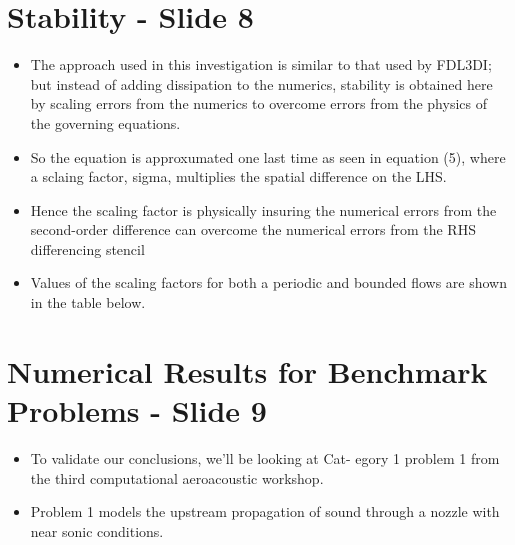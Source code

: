 \documentclass[a4paper,17pt]{extarticle}
\begin{document}
\pagebreak \section*{Stability - Slide 8}
\begin{itemize}
   \item The approach used in this investigation is similar to that used by FDL3DI; but instead of
      adding dissipation to the numerics, stability is obtained here by scaling errors from the
      numerics to overcome errors from the physics of the governing equations.
   \item So the equation is approxumated one last time as seen in equation (5), where a sclaing
         factor, sigma, multiplies the spatial difference on the LHS. 
   \item Hence the scaling factor is physically insuring the numerical errors from the second-order
         difference can overcome the numerical errors from the RHS differencing stencil
   \item Values of the scaling factors for both a periodic and bounded flows are shown in the table 
         below.
\end{itemize}

\pagebreak \section*{Numerical Results for Benchmark Problems - Slide 9}
\begin{itemize}
   \item To validate our conclusions, we’ll be looking at Cat- egory 1 problem 1 from the third
      computational aeroacoustic workshop.
   \item Problem 1 models the upstream propagation of sound through a nozzle with near sonic 
         conditions.
\end{itemize}
\end{document}

